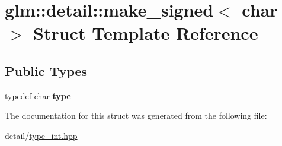 \hypertarget{structglm_1_1detail_1_1make__signed_3_01char_01_4}{\section{glm\-:\-:detail\-:\-:make\-\_\-signed$<$ char $>$ Struct Template Reference}
\label{structglm_1_1detail_1_1make__signed_3_01char_01_4}
}
\subsection*{Public Types}
\begin{DoxyCompactItemize}
\item 
\hypertarget{structglm_1_1detail_1_1make__signed_3_01char_01_4_ad92111512e0af83393df0905896d478f}{typedef char {\bfseries type}}\label{structglm_1_1detail_1_1make__signed_3_01char_01_4_ad92111512e0af83393df0905896d478f}

\end{DoxyCompactItemize}


The documentation for this struct was generated from the following file\-:\begin{DoxyCompactItemize}
\item 
detail/\hyperlink{type__int_8hpp}{type\-\_\-int.\-hpp}\end{DoxyCompactItemize}
